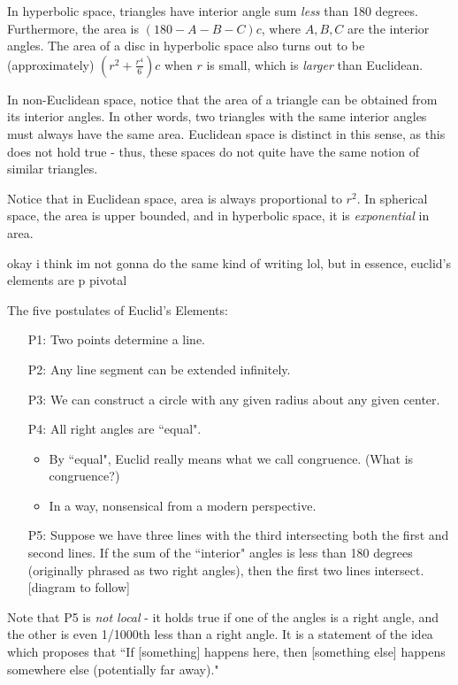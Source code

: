 \documentclass{article}
\begin{document}
In hyperbolic space, triangles have interior angle sum \textit{less} than 180 degrees.
Furthermore, the area is $ (180 - A - B - C)c $, where $ A,B,C $ are the interior angles.
The area of a disc in hyperbolic space also turns out to be (approximately)
$ (r^{2} + \frac{r^{4}}{6})c $ when $ r $ is small, which is \textit{larger} than Euclidean.

In non-Euclidean space, notice that the area of a triangle can be obtained from its interior
angles. In other words, two triangles with the same interior angles must always have the same area.
Euclidean space is distinct in this sense, as this does not hold true - thus, these spaces do not
quite have the same notion of similar triangles.

Notice that in Euclidean space, area is always proportional to $ r^{2} $. In spherical space, the
area is upper bounded, and in hyperbolic space, it is \textit{exponential} in area.

okay i think im not gonna do the same kind of writing lol,
but in essence, euclid's elements are p pivotal

The five postulates of Euclid's Elements:
\begin{enumerate}
    \item[P1:] Two points determine a line.
    \item[P2:] Any line segment can be extended infinitely.
    \item[P3:] We can construct a circle with any given radius about any given center.
    \item[P4:] All right angles are ``equal".
    \begin{itemize}
        \item By ``equal", Euclid really means what we call congruence. (What is congruence?)
        \item In a way, nonsensical from a modern perspective.
    \end{itemize}
    \item[P5:] Suppose we have three lines with the third intersecting both the first and second
        lines. If the sum of the ``interior" angles is less than 180 degrees (originally phrased as
        two right angles), then the first two lines intersect. [diagram to follow]
\end{enumerate}
Note that P5 is \textit{not local} - it holds true if one of the angles is a right
angle, and the other is even 1/1000th less than a right angle. It is a statement of the idea which
proposes that ``If [something] happens here, then [something else] happens somewhere else
(potentially far away)."
\end{document}
